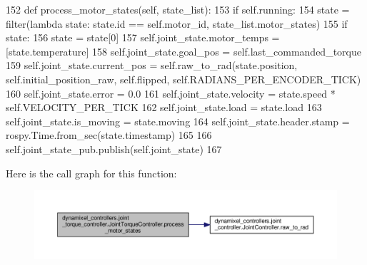 \begin{DoxyCode}
152     \textcolor{keyword}{def }process\_motor\_states(self, state\_list):
153         \textcolor{keywordflow}{if} self.running:
154             state = filter(\textcolor{keyword}{lambda} state: state.id == self.motor\_id, state\_list.motor\_states)
155             \textcolor{keywordflow}{if} state:
156                 state = state[0]
157                 self.joint\_state.motor\_temps = [state.temperature]
158                 self.joint\_state.goal\_pos = self.last\_commanded\_torque
159                 self.joint\_state.current\_pos = self.raw\_to\_rad(state.position, self.initial\_position\_raw, 
      self.flipped, self.RADIANS\_PER\_ENCODER\_TICK)
160                 self.joint\_state.error = 0.0
161                 self.joint\_state.velocity = state.speed * self.VELOCITY\_PER\_TICK
162                 self.joint\_state.load = state.load
163                 self.joint\_state.is\_moving = state.moving
164                 self.joint\_state.header.stamp = rospy.Time.from\_sec(state.timestamp)
165                 
166                 self.joint\_state\_pub.publish(self.joint\_state)
167 
\end{DoxyCode}
Here is the call graph for this function\+:
\nopagebreak
\begin{figure}[H]
\begin{center}
\leavevmode
\includegraphics[width=350pt]{db/d80/classdynamixel__controllers_1_1joint__torque__controller_1_1_joint_torque_controller_a272b1c9a711f608b3761e27a30e0ec80_cgraph}
\end{center}
\end{figure}
\mbox{\label{classdynamixel__controllers_1_1joint__controller_1_1_joint_controller_aed0bae387958b56f88fd707e9da9e8f1}} 
